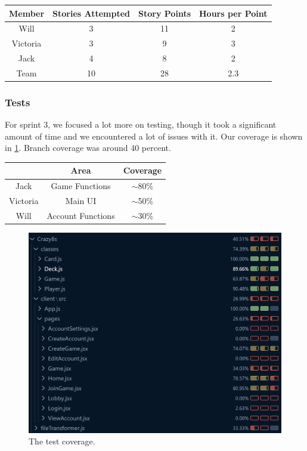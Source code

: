 \documentclass{article}
\begin{document}
\begin{table}[h]
\centering
\begin{tabular}{|c|c|c|c|}
\hline
\textbf{Member} & \textbf{Stories Attempted} & \textbf{Story Points} & \textbf{Hours per Point} \\ \hline
Will     & 3 & 11  & 2 \\ \hline
Victoria & 3 & 9 & 3 \\ \hline
Jack     & 4 & 8 & 2 \\ \hline
Team    & 10 & 28 & 2.3 \\ \hline
\end{tabular}
\end{table}

\begin{tcolorbox}[colback=blue!10, colframe=blue, boxrule=0.5mm, sharp corners=south]
\subsubsection{Tests}

For sprint 3, we focused a lot more on testing, though it took a significant amount of time and we encountered a lot of issues with it. Our coverage is shown in \ref{fig:sprint3tests}. Branch coverage was around 40 percent.
\end{tcolorbox}

\begin{table}[h]
\centering
\begin{tabular}{|c|c|c|}
\hline
\textbf{} & \textbf{Area}     & \textbf{Coverage} \\ \hline
Jack      & Game Functions    & $\sim$80\%        \\ \hline
Victoria  & Main UI           & $\sim$50\%        \\ \hline
Will      & Account Functions & $\sim$30\%        \\ \hline
\end{tabular}
\end{table}

\begin{figure}[h]
\centering
\includegraphics[width=\linewidth]{sprint3tests.png}
\caption{\label{fig:sprint3tests}The test coverage.}
\end{figure}
\end{document}
